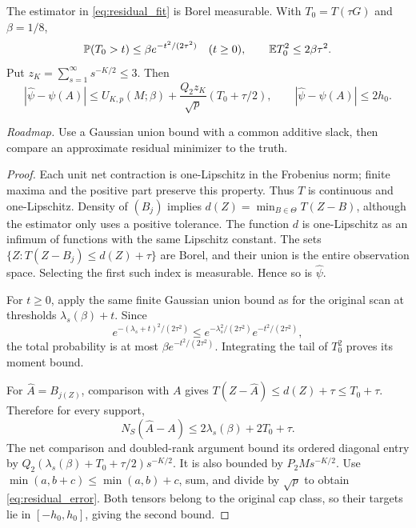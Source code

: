 \begin{lemma}\label{lem:residual_fit}
The estimator in \eqref{eq:residual_fit} is Borel measurable. With $T_0=T(\tau G)$ and $\beta=1/8$,
\[
 \mathbb P(T_0>t)\le\beta e^{-t^2/(2\tau^2)}\quad(t\ge0),
 \qquad \mathbb E T_0^2\le2\beta\tau^2.
\]
Put $z_K=\sum_{s=1}^{\infty}s^{-K/2}\le3$. Then
\begin{equation}\label{eq:residual_error}
 |\widehat\psi-\psi(A)|\le U_{K,p}(M;\beta)
              +\frac{Q_2z_K}{\sqrt p}(T_0+\tau/2),
 \qquad |\widehat\psi-\psi(A)|\le2h_0.
\end{equation}
\end{lemma}
\noindent\emph{Roadmap.} Use a Gaussian union bound with a common additive slack, then compare an approximate residual minimizer to the truth.
\begin{proof}
Each unit net contraction is one-Lipschitz in the Frobenius norm; finite maxima and the positive part preserve this property. Thus $T$ is continuous and one-Lipschitz. Density of $(B_j)$ implies
$d(Z)=\min_{B\in\Theta}T(Z-B)$, although the estimator only uses a positive tolerance. The function $d$ is one-Lipschitz as an infimum of functions with the same Lipschitz constant. The sets $\{Z:T(Z-B_j)\le d(Z)+\tau\}$ are Borel, and their union is the entire observation space. Selecting the first such index is measurable. Hence so is $\widehat\psi$.

For $t\ge0$, apply the same finite Gaussian union bound as for the original scan at thresholds $\lambda_s(\beta)+t$. Since
\[
 e^{-(\lambda_s+t)^2/(2\tau^2)}
 \le e^{-\lambda_s^2/(2\tau^2)}e^{-t^2/(2\tau^2)},
\]
the total probability is at most $\beta e^{-t^2/(2\tau^2)}$. Integrating the tail of $T_0^2$ proves its moment bound.

For $\widehat A=B_{j(Z)}$, comparison with $A$ gives
$T(Z-\widehat A)\le d(Z)+\tau\le T_0+\tau$. Therefore for every support,
\[
 N_S(\widehat A-A)\le2\lambda_s(\beta)+2T_0+\tau.
\]
The net comparison and doubled-rank argument bound its ordered diagonal entry by
$Q_2(\lambda_s(\beta)+T_0+\tau/2)s^{-K/2}$.
It is also bounded by $P_2M s^{-K/2}$. Use
$\min(a,b+c)\le\min(a,b)+c$, sum, and divide by $\sqrt p$ to obtain \eqref{eq:residual_error}. Both tensors belong to the original cap class, so their targets lie in $[-h_0,h_0]$, giving the second bound.
\end{proof}

